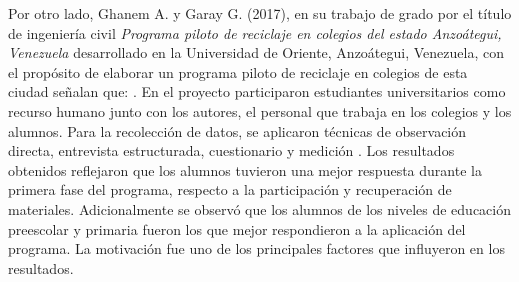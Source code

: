 Por otro lado, Ghanem A. y Garay G. (2017), en su trabajo de grado por el título de ingeniería civil \textit{Programa piloto de reciclaje en colegios del estado Anzoátegui, Venezuela} desarrollado en la Universidad de Oriente, Anzoátegui, Venezuela, con el propósito de elaborar un programa piloto de reciclaje en colegios de esta ciudad señalan que: . En el proyecto participaron estudiantes universitarios como recurso humano junto con los autores, el personal que trabaja en los colegios y los alumnos. Para la recolección de datos, se aplicaron técnicas de observación directa, entrevista estructurada, cuestionario y medición . Los resultados obtenidos reflejaron que los alumnos tuvieron una mejor respuesta durante la primera fase del programa, respecto a la participación y recuperación de materiales. Adicionalmente se observó que los alumnos de los niveles de educación preescolar y primaria fueron los que mejor respondieron a la aplicación del programa. La motivación fue uno de los principales factores que influyeron en los resultados.


